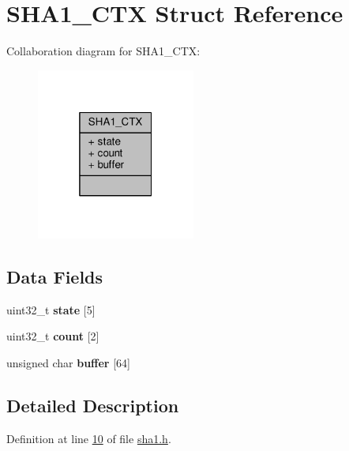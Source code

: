 \hypertarget{structSHA1__CTX}{}\section{S\+H\+A1\+\_\+\+C\+TX Struct Reference}
\label{structSHA1__CTX}


Collaboration diagram for S\+H\+A1\+\_\+\+C\+TX\+:\nopagebreak
\begin{figure}[H]
\begin{center}
\leavevmode
\includegraphics[width=148pt]{structSHA1__CTX__coll__graph}
\end{center}
\end{figure}
\subsection*{Data Fields}
\begin{DoxyCompactItemize}
\item 
\mbox{\label{structSHA1__CTX_a81d7f6018258ee84f001284c6ff9d2d5}} 
uint32\+\_\+t {\bfseries state} \mbox{[}5\mbox{]}
\item 
\mbox{\label{structSHA1__CTX_a7db1dac8c2309a5b22f1cf4bc5de96a5}} 
uint32\+\_\+t {\bfseries count} \mbox{[}2\mbox{]}
\item 
\mbox{\label{structSHA1__CTX_a90100b1aab0fedb1d72ded66abeeffe2}} 
unsigned char {\bfseries buffer} \mbox{[}64\mbox{]}
\end{DoxyCompactItemize}


\subsection{Detailed Description}


Definition at line \hyperlink{sha1_8h_source_l00010}{10} of file \hyperlink{sha1_8h_source}{sha1.\+h}.



